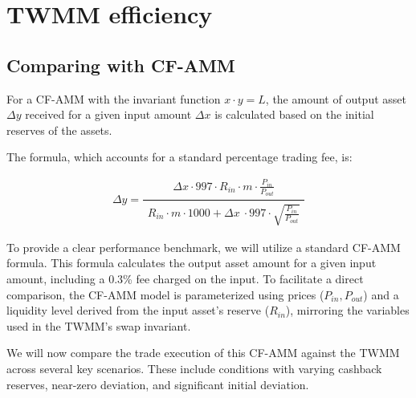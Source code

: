 \section{TWMM efficiency}
\subsection{Comparing with CF-AMM}
For a CF-AMM with the invariant function $x \cdot y = L$, the amount of output asset $\Delta y$ received for a given input amount $\Delta x$ is calculated based on the initial reserves of the assets.

The formula, which accounts for a standard percentage trading fee, is:

\begin{equation}
	\label{eq:cfamm_price_function}
	\Delta y=\frac{ 
		\begin{aligned} 
			\Delta x\cdot997\cdot R_{in}\cdot m \cdot\frac{P_{in}}{P_{out}} 
		\end{aligned}
	}{
		\begin{aligned} 
			R_{in}\cdot m \cdot1000+ \Delta x\ \cdot997\cdot\sqrt{\frac{P_{in}}{P_{out}}}
		\end{aligned}
	}
\end{equation}

To provide a clear performance benchmark, we will utilize a standard CF-AMM formula. This formula calculates the output asset amount for a given input amount, including a 0.3\% fee charged on the input. To facilitate a direct comparison, the CF-AMM model is parameterized using prices ($P_{in}, P_{out}$) and a liquidity level derived from the input asset's reserve ($R_{in}$), mirroring the variables used in the TWMM's swap invariant.

We will now compare the trade execution of this CF-AMM against the TWMM across several key scenarios. These include conditions with varying cashback reserves, near-zero deviation, and significant initial deviation.

